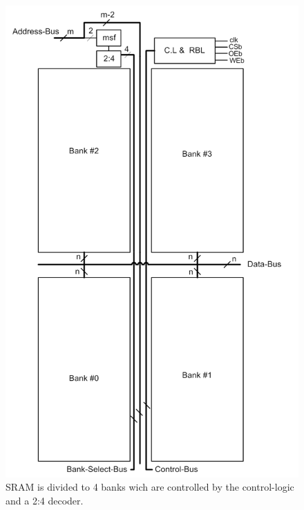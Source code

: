 \begin{figure}[h!]
\centering
\includegraphics[scale=.9]{./figs/bank4.pdf}
\caption{SRAM is divided to 4 banks wich are controlled by the control-logic and a 2:4 decoder.}
\label{fig:bank4}
\end{figure}


